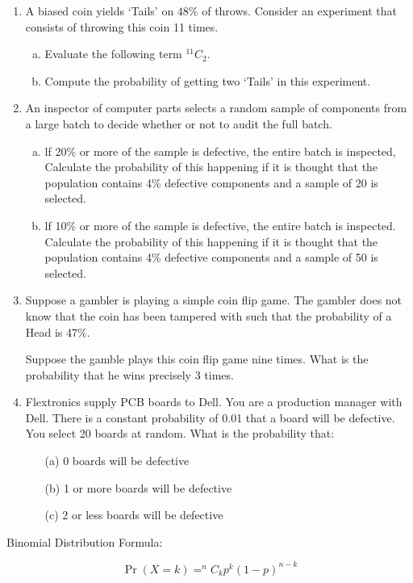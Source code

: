 \documentclass[a4paper,12pt]{article}
\begin{document}
\begin{enumerate}
\item A biased coin yields `Tails' on $48\%$ of throws. Consider an experiment that consists of throwing this coin 11 times.
\begin{enumerate}[(a)]
	\item Evaluate the following term $^{11}C_2$.
	\item Compute the probability of getting two `Tails' in this experiment.
\end{enumerate}

\newpage

\item 
An inspector of computer parts selects a random sample of components
from a large batch to decide whether or not to audit the full batch.

\begin{enumerate}[(a)]
	\item lf 20\% or more of the sample is defective, the entire batch is
	inspected, Calculate the probability of this happening if it is
	thought that the population contains 4\% defective components and
	a sample of 20 is selected.
	\item lf 10\% or more of the sample is defective, the entire batch is
	inspected. Calculate the probability of this happening if it is
	thought that the population contains 4\% defective components and
	a sample of 50 is selected.
	
\end{enumerate}

\item 
Suppose a gambler is playing a simple coin flip game. 
The gambler does not know that the coin has been tampered with such that the probability of a Head is 47\%.

Suppose the gamble plays this coin flip game nine times. 
What is the probability that he wins precisely 3 times.
\item	Flextronics supply PCB boards to Dell.  You are a production manager with Dell.  There is a constant probability of 0.01 that a board will be defective.  You select 20 boards at random.  What is the probability that:
\begin{itemize}
	\item[(a)]	0 boards will be defective
	\item[(b)]	1 or more boards will be defective
	\item[(c)]	2 or less boards will be defective			

\end{itemize}

	\end{enumerate}
\begin{framed}
\noindent Binomial Distribution Formula:

\[\Pr(X = k) = ^nC_k p^k
(1 - p)^{n-k}\]	
\end{framed}
	
\end{document}
